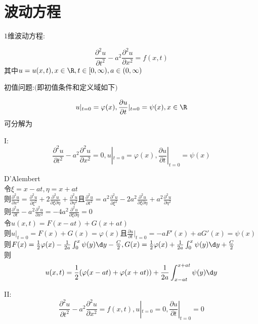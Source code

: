 

%

\setcounter{section}{0}
\setcounter{subsection}{0}

\chapter{波动方程}

$1$维波动方程:

\[\frac{\partial^2 u}{\partial t^2}-a^2\frac{\partial^2u}{\partial x^2}=f(x,t)\]
其中$u=u(x,t),x\in\R,t\in [0,\infty),a\in(0,\infty)$

初值问题:$($即初值条件和定义域如下$)$

\[u|_{t=0}=\varphi(x),\frac{\partial u}{\partial t}|_{t=0}=\psi(x),x\in\R\]
可分解为

I:\[\frac{\partial^2u}{\partial t^2}-a^2\frac{\partial^2u}{\partial x^2}=0,u|_{t=0}=\varphi(x),\frac{\partial u}{\partial t}|_{t=0}=\psi(x)\]

\begin{jie}D'Alembert\\
令$\xi=x-at,\eta=x+at$\\
则$\frac{\partial^2u}{\partial x^2}=\frac{\partial^2u}{\partial \xi^2}+2\frac{\partial^2u}{\partial\xi\partial\eta}+\frac{\partial^2u}{\partial\eta^2}$且$\frac{\partial^2u}{\partial t^2}=a^2\frac{\partial^2u}{\partial \xi^2}-2a^2\frac{\partial^2u}{\partial\xi\partial\eta}+a^2\frac{\partial^2u}{\partial\eta^2}$\\
则$\frac{\partial^2u}{\partial t}-a^2\frac{\partial^2u}{\partial x^2}=-4a^2\frac{\partial^2u}{\partial\xi\partial\eta}=0$\\
令$u(x,t)=F(x-at)+G(x+at)$\\
则$u|_{t=0}=F(x)+G(x)=\varphi(x)$且$\frac{\partial u}{\partial t}|_{t=0}=-aF'(x)+aG'(x)=\psi(x)$\\
则$F(x)=\frac{1}{2}\varphi(x)-\frac{1}{2a}\int_{0}^{x}\psi(y)\d y-\frac{C}{2},G(x)=\frac{1}{2}\varphi(x)+\frac{1}{2a}\int_{0}^{x}\psi(y)\d y+\frac{C}{2}$\\
则\[u(x,t)=\frac{1}{2}(\varphi(x-at)+\varphi(x+at))+\frac{1}{2a}\int_{x-at}^{x+at}\psi(y)\d y\]
\end{jie}

II:\[\frac{\partial^2u}{\partial t^2}-a^2\frac{\partial^2u}{\partial x^2}=f(x,t),u|_{t=0}=0,\frac{\partial u}{\partial t}|_{t=0}=0\]

